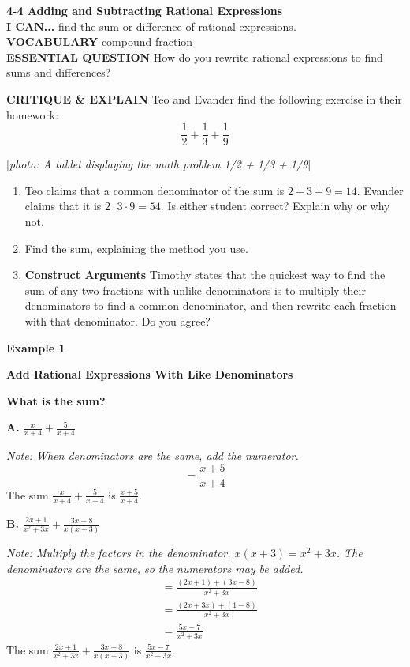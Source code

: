 \documentclass{article}
\newenvironment{lesson-meta}{}{}
\newenvironment{model-discuss}{}{}
\newenvironment{example}[1]{\textbf{Example #1}\par}{\par}
\newcommand{\placeholder}[2]{[\textit{#1: #2}]}
\begin{document}
\begin{lesson-meta}
\textbf{4-4 Adding and Subtracting Rational Expressions} \\
\textbf{I CAN...} find the sum or difference of rational expressions. \\
\textbf{VOCABULARY} compound fraction \\
\textbf{ESSENTIAL QUESTION} How do you rewrite rational expressions to find sums and differences?
\end{lesson-meta}

\begin{model-discuss}
\textbf{CRITIQUE \& EXPLAIN}
Teo and Evander find the following exercise in their homework:
\[ \frac{1}{2} + \frac{1}{3} + \frac{1}{9} \]

\placeholder{photo}{A tablet displaying the math problem 1/2 + 1/3 + 1/9}

\begin{enumerate}
    \item[\textbf{A.}] Teo claims that a common denominator of the sum is $2 + 3 + 9 = 14$. Evander claims that it is $2 \cdot 3 \cdot 9 = 54$. Is either student correct? Explain why or why not.
    \item[\textbf{B.}] Find the sum, explaining the method you use.
    \item[\textbf{C.}] \textbf{Construct Arguments} Timothy states that the quickest way to find the sum of any two fractions with unlike denominators is to multiply their denominators to find a common denominator, and then rewrite each fraction with that denominator. Do you agree?
\end{enumerate}
\end{model-discuss}

\begin{example}{1}
\textbf{Add Rational Expressions With Like Denominators}

\textbf{What is the sum?}

\textbf{A.} $\frac{x}{x + 4} + \frac{5}{x + 4}$

\textit{Note: When denominators are the same, add the numerator.}
\[ = \frac{x + 5}{x + 4} \]
The sum $\frac{x}{x + 4} + \frac{5}{x + 4}$ is $\frac{x + 5}{x + 4}$.

\textbf{B.} $\frac{2x + 1}{x^2 + 3x} + \frac{3x - 8}{x(x + 3)}$

\textit{Note: Multiply the factors in the denominator. $x(x + 3) = x^2 + 3x$. The denominators are the same, so the numerators may be added.}
\begin{align*}
    &= \frac{(2x + 1) + (3x - 8)}{x^2 + 3x} \\
    &= \frac{(2x + 3x) + (1 - 8)}{x^2 + 3x} \\
    &= \frac{5x - 7}{x^2 + 3x}
\end{align*}
The sum $\frac{2x + 1}{x^2 + 3x} + \frac{3x - 8}{x(x + 3)}$ is $\frac{5x - 7}{x^2 + 3x}$.
\end{example}
\end{document}

